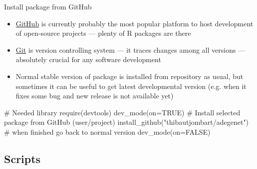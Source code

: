 \documentclass[compress, xelatex, 11pt, xcolor=svgnames, aspectratio=169,
	hyperref={
		bookmarks=true,
		unicode=true,
		colorlinks=true,
		pdftitle={Molecular data in R},
		plainpages=false,
		pdfauthor={Vojtech Zeisek},
		pdfsubject={Course about phylogeny and evolution in R},
		pdfcreator={XeLaTeX},
		pdfkeywords={R, evolution, phylogeny, molecular data},
		linkcolor=Crimson, %
		anchorcolor=Magenta, %
		citecolor=Magenta, %
		filecolor=Magenta, %
		menucolor=Magenta, %
		urlcolor=DodgerBlue, %
		},
	url={hyphens, lowtilde} %
	]{beamer}
\begin{document}
\begin{frame}[fragile]{Install package from GitHub}
	\begin{itemize}
		\item \href{https://github.com/}{GitHub} is currently probably the most popular platform to host development of open-source projects --- plenty of R packages are there
		\item \href{https://git-scm.com/}{Git} is version controlling system --- it traces changes among all versions --- absolutely crucial for any software development
		\item Normal stable version of package is installed from repository as usual, but sometimes it can be useful to get latest developmental version (e.g. when it fixes some bug and new release is not available yet)
	\end{itemize}
	\begin{spluscode}
    # Needed library
    require(devtools)
    dev_mode(on=TRUE)
    # Install selected package from GitHub (user/project)
    install_github("thibautjombart/adegenet")
    # when finished go back to normal version
    dev_mode(on=FALSE)
	\end{spluscode}
\end{frame}

\subsection{Scripts}
\end{document}
